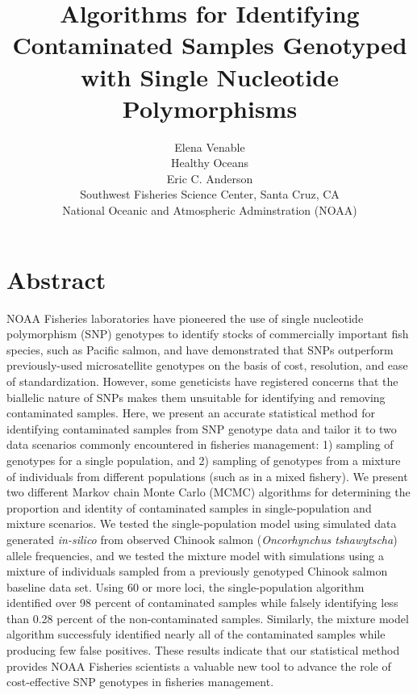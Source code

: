 \documentclass[12pt]{article}
\begin{document}
\normalem

\setlength{\parindent}{0cm}
\title{\textbf{Algorithms for Identifying Contaminated Samples Genotyped with Single Nucleotide Polymorphisms}}
\author{\Large Elena Venable\\ 
	Healthy Oceans\\
	Eric C. Anderson\\
	Southwest Fisheries Science Center, Santa Cruz, CA\\
	National Oceanic and Atmospheric Adminstration (NOAA)
  \date{}}
\maketitle

\section*{Abstract} 
NOAA Fisheries laboratories have pioneered the use of single nucleotide polymorphism (SNP) genotypes to identify stocks of commercially
important fish species, such as Pacific salmon, and have demonstrated that SNPs outperform previously-used microsatellite genotypes on the
basis of cost, resolution, and ease of standardization. However, some geneticists have registered concerns that the biallelic nature of SNPs makes them unsuitable for identifying and removing contaminated samples. Here, we
present an accurate statistical method for identifying contaminated samples from SNP genotype data and tailor it to two data scenarios
commonly encountered in fisheries management: 1) sampling of genotypes for a single population, and 2) sampling of genotypes from a mixture
of individuals from different populations (such as in a mixed fishery). We present two different Markov chain Monte Carlo (MCMC) algorithms
for determining the proportion and identity of contaminated samples in single-population and mixture scenarios. We tested the 
single-population model using simulated data generated {\em in-silico} from observed Chinook salmon
(\textit{Oncorhynchus tshawytscha}) allele frequencies, and we tested the mixture model with simulations using a mixture of individuals
sampled from a previously genotyped Chinook salmon baseline data set. Using 60 or more loci, the single-population algorithm identified over
98 percent of contaminated samples while falsely identifying less than 0.28 percent of the non-contaminated samples.  Similarly, the mixture
model algorithm successfuly identified nearly all of the contaminated samples while producing few false positives. These results indicate
that our statistical method provides NOAA Fisheries scientists a valuable new tool to advance the role of cost-effective SNP genotypes in
fisheries management.
\end{document}
